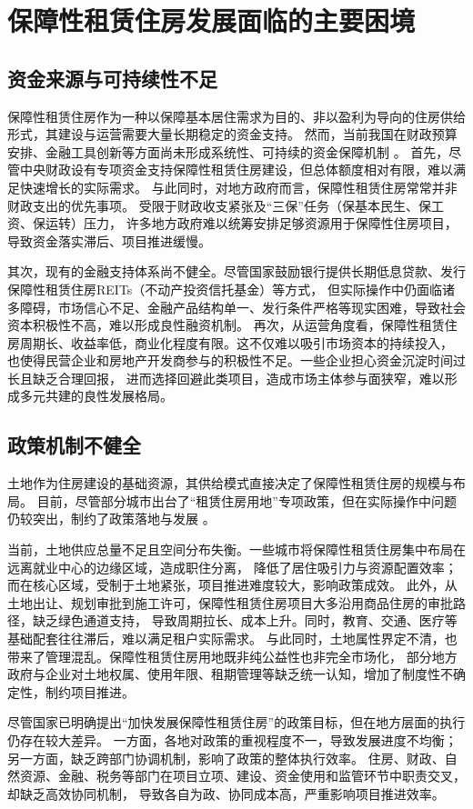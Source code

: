 \section{保障性租赁住房发展面临的主要困境}
\subsection{资金来源与可持续性不足}
保障性租赁住房作为一种以保障基本居住需求为目的、非以盈利为导向的住房供给形式，其建设与运营需要大量长期稳定的资金支持。
然而，当前我国在财政预算安排、金融工具创新等方面尚未形成系统性、可持续的资金保障机制 \cite{RN3}。
首先，尽管中央财政设有专项资金支持保障性租赁住房建设，但总体额度相对有限，难以满足快速增长的实际需求。
与此同时，对地方政府而言，保障性租赁住房常常并非财政支出的优先事项。
受限于财政收支紧张及“三保”任务（保基本民生、保工资、保运转）压力，
许多地方政府难以统筹安排足够资源用于保障性住房项目，导致资金落实滞后、项目推进缓慢。

其次，现有的金融支持体系尚不健全。尽管国家鼓励银行提供长期低息贷款、发行保障性租赁住房REITs（不动产投资信托基金）等方式，
但实际操作中仍面临诸多障碍，市场信心不足、金融产品结构单一、发行条件严格等现实困难，导致社会资本积极性不高，难以形成良性融资机制。
再次，从运营角度看，保障性租赁住房周期长、收益率低，商业化程度有限。这不仅难以吸引市场资本的持续投入，
也使得民营企业和房地产开发商参与的积极性不足。一些企业担心资金沉淀时间过长且缺乏合理回报，
进而选择回避此类项目，造成市场主体参与面狭窄，难以形成多元共建的良性发展格局。

\subsection{政策机制不健全}
土地作为住房建设的基础资源，其供给模式直接决定了保障性租赁住房的规模与布局。
目前，尽管部分城市出台了“租赁住房用地”专项政策，但在实际操作中问题仍较突出，制约了政策落地与发展 \cite{RN7}。

当前，土地供应总量不足且空间分布失衡。一些城市将保障性租赁住房集中布局在远离就业中心的边缘区域，造成职住分离，
降低了居住吸引力与资源配置效率；而在核心区域，受制于土地紧张，项目推进难度较大，影响政策成效。
此外，从土地出让、规划审批到施工许可，保障性租赁住房项目大多沿用商品住房的审批路径，缺乏绿色通道支持，
导致周期拉长、成本上升。同时，教育、交通、医疗等基础配套往往滞后，难以满足租户实际需求。
与此同时，土地属性界定不清，也带来了管理混乱。保障性租赁住房用地既非纯公益性也非完全市场化，
部分地方政府与企业对土地权属、使用年限、租期管理等缺乏统一认知，增加了制度性不确定性，制约项目推进。

尽管国家已明确提出“加快发展保障性租赁住房”的政策目标，但在地方层面的执行仍存在较大差异。
一方面，各地对政策的重视程度不一，导致发展进度不均衡；另一方面，缺乏跨部门协调机制，影响了政策的整体执行效率。
住房、财政、自然资源、金融、税务等部门在项目立项、建设、资金使用和监管环节中职责交叉，却缺乏高效协同机制，
导致各自为政、协同成本高，严重影响项目推进效率。

